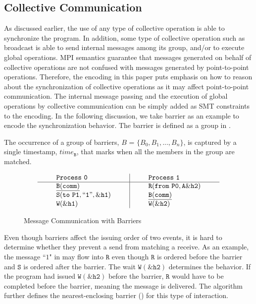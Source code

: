 \subsection{Collective Communication}
As discussed earlier, the use of any type of collective operation is able to synchronize the program. In addition, some type of collective operation such as broadcast is able to send internal messages among its group, and/or to execute global operations. MPI semantics guarantee that messages generated on behalf of collective operations are not confused with messages generated by point-to-point operations. Therefore, the encoding in this paper puts emphasis on how to reason about the synchronization of collective operations as it may affect point-to-point communication. The internal message passing and the execution of global operations by collective communication can be simply added as SMT constraints to the encoding. In the following discussion, we take barrier as an example to encode the synchronization behavior. The barrier is defined as a group in . 

\begin{definition}[Barrier]\label{def:barrier}
The occurrence of a group of barriers, $B$ = $\{B_0, B_1, ..., B_n\}$, is captured by a
single timestamp, $\mathit{time}_\mathtt{B}$, that marks when all the members in the group are matched.  
\end{definition}

\begin{figure}[h]
\[
\begin{array}{l|l}
\;\;\;\;\;\;\;\;\mathtt{Process\ 0}\;\;\;\;\;\;\;\; & \;\;\;\;\;\;\;\; \mathtt{Process\ 1}\;\;\;\;\;\;\;\; \\
\hline
\;\;\;\;\;\;\;\;\mathtt{\underline{B(comm)}}\;\;\;\;\;\;\;\; & \;\;\;\;\;\;\;\; \mathtt{R(from\ P0,A\&h2)}\;\;\;\;\;\;\;\; \\
\;\;\;\;\;\;\;\;\mathtt{S(to\ P1,``1",\&h1)}\;\;\;\;\;\;\;\; & \;\;\;\;\;\;\;\; \mathtt{\underline{B(comm)}}\;\;\;\;\;\;\;\; \\
\;\;\;\;\;\;\;\;\mathtt{W(\&h1)}\;\;\;\;\;\;\;\; & \;\;\;\;\;\;\;\; \mathtt{W(\&h2)}\;\;\;\;\;\;\;\; \\
\end{array}
\]
\caption{Message Communication with Barriers} \label{fig:mc_barrier1}
\end{figure}

Even though barriers affect the issuing order of two events, it is hard to determine whether they prevent a send from matching a receive. As an example, the message ``$1$" in  may flow into $\mathtt{R}$ even though $\mathtt{R}$ is ordered before the barrier and $\mathtt{S}$ is ordered after the barrier. The wait $\mathtt{W(\&h2)}$ determines the behavior. If the program had issued $\mathtt{W(\&h2)}$ before the barrier, $\mathtt{R}$ would have to be completed before the barrier, meaning the message is delivered. The algorithm further defines the nearest-enclosing barrier () for this type of interaction.


